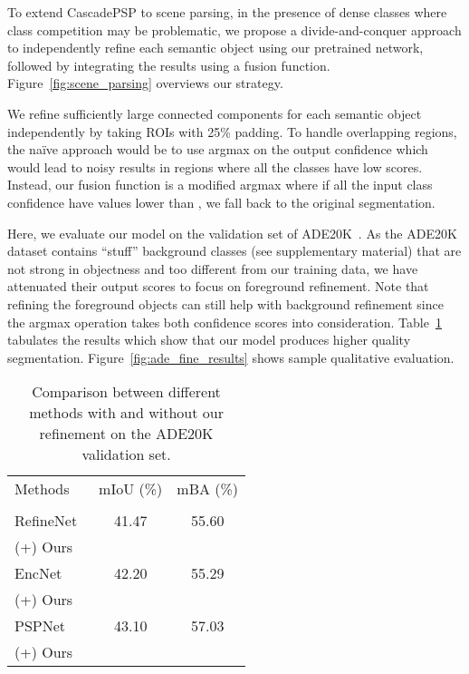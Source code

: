 \documentclass[10pt,twocolumn,letterpaper]{article}
\begin{document}
To extend CascadePSP to scene parsing, in the presence of dense classes where class competition may be problematic, we propose a divide-and-conquer approach to independently refine each semantic object using our pretrained network, followed by integrating the results using a fusion function. Figure~\ref{fig:scene_parsing} overviews our strategy. 

We refine sufficiently large connected components for each semantic object independently by taking ROIs with 25\% padding. 
To handle overlapping regions, the na\"ive approach would be to use argmax on the output confidence which would lead to noisy results in regions where all the classes have low scores.
Instead, our fusion function is a modified argmax where if all the input class confidence have values lower than , we fall back to the original segmentation. 

Here, we evaluate our model on the validation set of ADE20K~\cite{zhou2017scene}. 
As the ADE20K dataset contains ``stuff'' background classes (see supplementary material) that are not strong in objectness and too different from our training data, we have attenuated their output scores to focus on foreground refinement.
Note that refining the foreground objects can still help with background refinement since the argmax operation takes both confidence scores into consideration.
Table~\ref{tab:multiclass_table} tabulates the results which show that our model produces higher quality segmentation. Figure~\ref{fig:ade_fine_results} shows sample qualitative evaluation.


\begin{table}[t]
	\centering
	\begin{tabular}{l|c|c}
		Methods & mIoU (\%) & mBA (\%) \\
		\hhline{|=|=|=|} 
		\multicolumn{3}{c}{\textbf{ADE20K}} \\
		\Xhline{2\arrayrulewidth}
		RefineNet~\cite{lin2017refinenet} & 41.47 & 55.60 \\
		\quad (+) Ours &  &  \\
		\hline
		EncNet~\cite{zhang2018context} & 42.20 & 55.29 \\
		\quad (+) Ours &  &  \\
		\hline
		PSPNet~\cite{zhao2017pyramid} & 43.10  & 57.03  \\
		\quad (+) Ours &  &  \\
	\end{tabular}
    \caption{Comparison between different methods with and without our refinement on the ADE20K validation set.}
	\label{tab:multiclass_table}
	\vspace{-0.2in}
\end{table}
\end{document}
